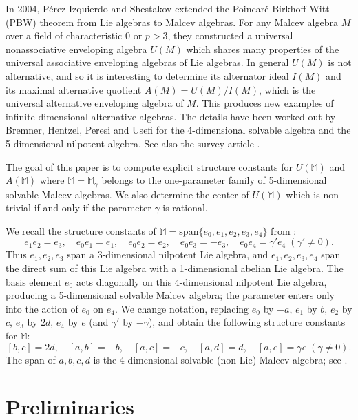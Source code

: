\documentclass{amsart}
\theoremstyle{plain}
\theoremstyle{definition}
\begin{document}
In 2004, P\'erez-Izquierdo and Shestakov \cite{PerezIzquierdoShestakov}
extended the Poincar\'e-Birkhoff-Witt (PBW) theorem from Lie algebras to Malcev
algebras. For any Malcev algebra $M$ over a field of characteristic 0 or $p
> 3$, they constructed a universal nonassociative enveloping algebra
$U(M)$ which shares many properties of the universal associative enveloping
algebras of Lie algebras. In general $U(M)$ is not alternative, and so it is
interesting to determine its alternator ideal $I(M)$ and its maximal
alternative quotient $A(M) = U(M)/I(M)$, which is the universal alternative
enveloping algebra of $M$. This produces new examples of infinite dimensional
alternative algebras. The details have been worked out by Bremner, Hentzel,
Peresi and Usefi \cite{BHPU,BremnerUsefi} for the 4-dimensional solvable
algebra and the 5-dimensional nilpotent algebra.  See also the survey article
\cite{BHPTU}.

The goal of this paper is to compute explicit structure constants for
$U(\mathbb{M})$ and $A(\mathbb{M})$ where $\mathbb{M} = \mathbb{M}_\gamma$
belongs to the one-parameter family of 5-dimensional solvable Malcev algebras.
We also determine the center of $U(\mathbb{M})$ which is non-trivial if and
only if the parameter $\gamma$ is rational.

We recall the structure constants of $\mathbb{M}=\text{span}\{e_0, e_1, e_2,
e_3, e_4\}$ from \cite{Kuzmin}:
  \[
  e_1 e_2 = e_3, \quad
  e_0 e_1 = e_1, \quad
  e_0 e_2 = e_2, \quad
  e_0 e_3 = - e_3, \quad
  e_0 e_4 = \gamma' e_4 \; (\gamma' \ne 0).
  \]
Thus $e_1, e_2, e_3$ span a 3-dimensional nilpotent Lie algebra, and $e_1, e_2,
e_3, e_4$ span the direct sum of this Lie algebra with a 1-dimensional abelian
Lie algebra. The basis element $e_0$ acts diagonally on this 4-dimensional
nilpotent Lie algebra, producing a 5-dimensional solvable Malcev algebra; the
parameter enters only into the action of $e_0$ on $e_4$. We change notation,
replacing $e_0$ by $-a$, $e_1$ by $b$, $e_2$ by $c$, $e_3$ by $2 d$, $e_4$ by
$e$ (and $\gamma'$ by $-\gamma$), and obtain the following structure constants
for $\mathbb{M}$:
  \begin{equation}
  \label{oneparameterfamily}
  [ b, c ] = 2 d, \quad
  [ a, b ] = - b, \quad
  [ a, c ] = - c, \quad
  [ a, d ] = d, \quad
  [ a, e ] = \gamma e \; (\gamma \ne 0).
  \end{equation}
The span of $a, b, c, d$ is the 4-dimensional solvable (non-Lie) Malcev
algebra; see \cite{BHPU}.


\section{Preliminaries}
\end{document}
